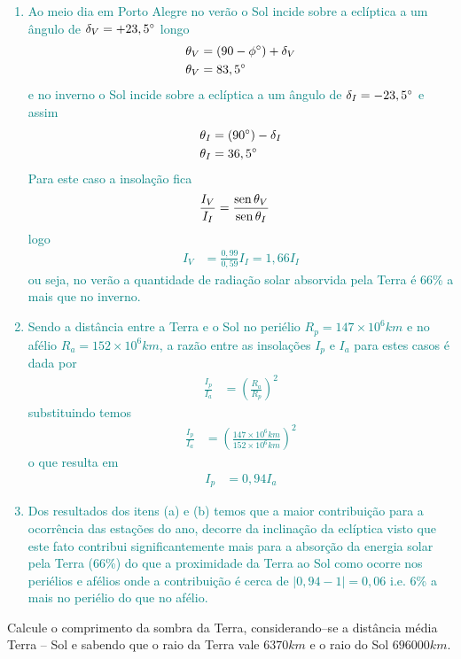 \begin{sol}
	\textcolor{teal} {
		\begin{enumerate}[label=\alph *)]
			\item Ao meio dia em Porto Alegre no verão o Sol incide sobre a eclíptica a um ângulo de $\delta_{V}=+23,5^{\circ}$ longo
			\begin{align}
				\theta_{V}&=\left(90-\phi^{\circ}\right)+\delta_{V}\nonumber \\
				\theta_{V}&=83,5^{\circ}
			\end{align}
			e no inverno o Sol incide sobre a eclíptica a um ângulo de $\delta_{I}=-23,5^{\circ}$ e assim
			\begin{align}
				\theta_{I}&=\left(90^{\circ}\right)-\delta_{I}\nonumber \\
				\theta_{I}&=36,5^{\circ}
			\end{align}
			Para este caso a insolação fica
			\begin{align}
				\frac{I_V}{I_I}&=\frac{\operatorname{sen}\theta_V}{\operatorname{sen}\theta_I}				
			\end{align}
			logo
			\begin{align}
				I_V&=\frac{0,99}{0,59}I_I=1,66I_I
			\end{align}
			ou seja, no verão a quantidade de radiação solar absorvida pela Terra é 66\% a mais que no inverno.
			\item Sendo a distância entre a Terra e o Sol no periélio $R_{p}=147\times 10^{6}km$ e no afélio $R_{a}=152\times 10^{6}km$, a razão entre as insolações $I_p$ e $I_a$ para estes casos é dada por
			\begin{align}
				\frac{I_p}{I_a}&=\left(\frac{R_a}{R_p}\right)^2
			\end{align}
			substituindo temos
			\begin{align}
				\frac{I_p}{I_a}&=\left(\frac{147\times 10^{6}km}{152\times 10^{6}km}\right)^2
			\end{align}
			o que resulta em
			\begin{align}
				I_p&=0,94I_a
			\end{align}
			\item Dos resultados dos itens (a) e (b) temos que a maior contribuição para a ocorrência das estações do ano, decorre da inclinação da eclíptica visto que este fato contribui significantemente mais para a absorção da energia solar pela Terra (66\%) do que a proximidade da Terra ao Sol como ocorre nos periélios e afélios onde a contribuição é cerca de $|0,94-1|=0,06$ i.e. 6\% a mais no periélio do que no afélio.
		\end{enumerate}
	}
\end{sol}
\begin{prob}[ref: P22]
	Calcule o comprimento da sombra da Terra, considerando–se a distância média Terra – Sol e sabendo que o raio da Terra vale $6370 km$ e o raio do Sol $696000 km$.
\end{prob}

